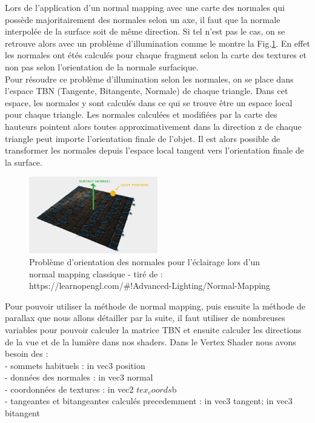 \documentclass[a4paper]{article}
\begin{document}
Lors de l'application d'un normal mapping avec une carte des normales qui possède majoritairement des normales selon un axe, il faut que la normale interpolée de la surface soit de même direction. Si tel n'est pas le cas, on se retrouve alors avec un problème d'illumination  comme le montre la Fig.\ref{lighting_problem}. En effet les normales ont étés calculés pour chaque fragment selon la carte des textures et non pas selon l'orientation de la normale surfacique. \\

Pour résoudre ce problème d'illumination selon les normales, on se place dans l'espace TBN (Tangente, Bitangente, Normale) de chaque triangle. Dans cet espace, les normales y sont calculés dans ce qui se trouve être un espace local pour chaque triangle. Les normales calculées et modifiées par la carte des hauteurs pointent alors toutes approximativement dans la direction z de chaque triangle peut importe l'orientation finale de l'objet. Il est alors possible de transformer les normales depuis l'espace local tangent vers l'orientation finale de la surface. 


\begin{figure}[H]
\centering
\includegraphics[width=0.5\textwidth]{figures/lighting_problem.png}
\caption{Problème d'orientation des normales pour l'éclairage lors d'un normal mapping classique - tiré de :  https://learnopengl.com/\#!Advanced-Lighting/Normal-Mapping}\label{lighting_problem}
\end{figure}


Pour pouvoir utiliser la méthode de normal mapping, puis ensuite la méthode de parallax que nous allons détailler par la suite, il faut utiliser de nombreuses variables  pour pouvoir calculer la matrice TBN et ensuite calculer les directions de la vue et de la lumière dans nos shaders.
Dans le Vertex Shader nous avons besoin des : \\
- sommets habituels : in vec3 position \\
- données des normales : in vec3 normal \\
- coordonnées de textures : in vec2 $tex_coords$b\\
- tangeantes et bitangeantes calculés precedemment : in vec3 tangent; in vec3 bitangent
 \\
\end{document}
